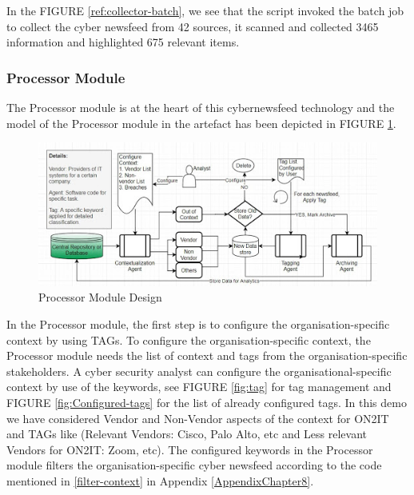 In the FIGURE \ref{ref:collector-batch}, 
we see that the script invoked the batch job to collect the cyber newsfeed from 42 sources, 
it scanned and collected 3465 information and highlighted 675 relevant items.

\subsubsection{Processor Module}
The Processor module is at the heart of this cybernewsfeed technology and the model of the Processor module in the artefact has been depicted in FIGURE \ref{fig:processor}. 
\begin{figure}[ht]
    \centering
    \includegraphics[width=1\linewidth]{Figures/processor.png}
    \caption{Processor Module Design}
    \label{fig:processor}
\end{figure}
 \FloatBarrier
In the Processor module, the first step is to configure the organisation-specific context by using TAGs. To configure the organisation-specific context, the Processor module needs the list of context and tags from the organisation-specific stakeholders.  A cyber security analyst can configure the organisational-specific context by use of the keywords, 
see FIGURE \ref{fig:tag} for tag management and FIGURE \ref{fig:Configured-tags} for the list of already configured tags. In this demo we have considered Vendor and Non-Vendor aspects of the context for ON2IT and TAGs like (Relevant Vendors: Cisco, Palo Alto, etc and Less relevant Vendors for ON2IT: Zoom, etc). The configured keywords in  the Processor module filters the organisation-specific cyber newsfeed according to the code mentioned in \ref{filter-context} in Appendix \ref{AppendixChapter8}.

